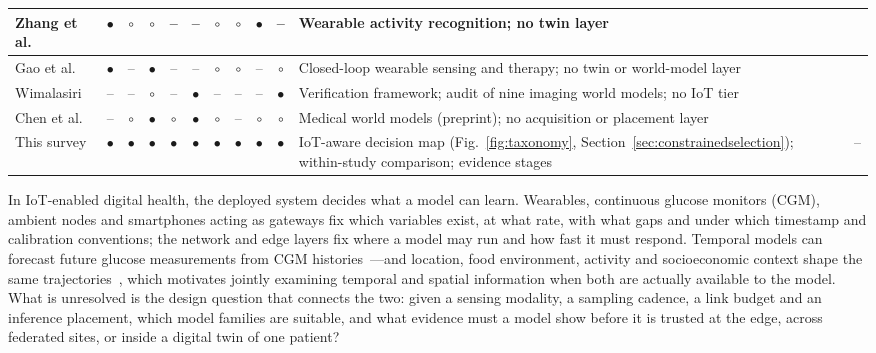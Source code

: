 \documentclass[journal]{IEEEtran}
\begin{document}
\begin{table}[tp]
\begin{tabularx}{\textwidth}{|>{\raggedright\arraybackslash}p{2.15cm}|c|c|c|c|c|c|c|c|c|>{\raggedright\arraybackslash}X|>{\raggedright\arraybackslash}p{0.95cm}|}
\hline
Zhang et al. & $\bullet$ & $\circ$ & $\circ$ & -- & -- & $\circ$ & $\circ$ & $\bullet$ & -- & Wearable activity recognition; no twin layer & \cite{zhang2022harreview} \\
\hline
Gao et al. & $\bullet$ & -- & $\bullet$ & -- & -- & $\circ$ & $\circ$ & -- & $\circ$ & Closed-loop wearable sensing and therapy; no twin or world-model layer & \cite{gao2026closedloop} \\
\hline
Wimalasiri & -- & -- & $\circ$ & -- & $\bullet$ & -- & -- & -- & $\bullet$ & Verification framework; audit of nine imaging world models; no IoT tier & \cite{wimalasiri2026verifiable} \\
\hline
Chen et al. & -- & $\circ$ & $\bullet$ & $\circ$ & $\bullet$ & $\circ$ & -- & $\circ$ & $\circ$ & Medical world models (preprint); no acquisition or placement layer & \cite{chen2026medicalwm} \\
\hline
This survey & $\bullet$ & $\bullet$ & $\bullet$ & $\bullet$ & $\bullet$ & $\bullet$ & $\bullet$ & $\bullet$ & $\bullet$ & IoT-aware decision map (Fig.~\ref{fig:taxonomy}, Section~\ref{sec:constrainedselection}); within-study comparison; evidence stages & -- \\
\hline
\end{tabularx}

\end{table}

In IoT-enabled digital health, the deployed system decides what a model can learn. Wearables, continuous glucose monitors (CGM), ambient nodes and smartphones acting as gateways fix which variables exist, at what rate, with what gaps and under which timestamp and calibration conventions; the network and edge layers fix where a model may run and how fast it must respond. Temporal models can forecast future glucose measurements from CGM histories~\cite{Li2020GluNet}---and location, food environment, activity and socioeconomic context shape the same trajectories~\cite{McCullough2022Diet}, which motivates jointly examining temporal and spatial information when both are actually available to the model. What is unresolved is the design question that connects the two: given a sensing modality, a sampling cadence, a link budget and an inference placement, which model families are suitable, and what evidence must a model show before it is trusted at the edge, across federated sites, or inside a digital twin of one patient?
\end{document}
